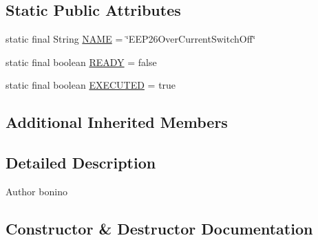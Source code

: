 \subsection*{Static Public Attributes}
\begin{DoxyCompactItemize}
\item 
static final String \hyperlink{classit_1_1polito_1_1elite_1_1enocean_1_1enj_1_1eep_1_1eep26_1_1attributes_1_1_e_e_p26_over_current_switch_off_a407b02293778560ad6dd0c26a29646ae}{N\+A\+ME} = \char`\"{}E\+E\+P26\+Over\+Current\+Switch\+Off\char`\"{}
\item 
static final boolean \hyperlink{classit_1_1polito_1_1elite_1_1enocean_1_1enj_1_1eep_1_1eep26_1_1attributes_1_1_e_e_p26_over_current_switch_off_ad3c43b4a3a126c3e1e597dc3234f8aa4}{R\+E\+A\+DY} = false
\item 
static final boolean \hyperlink{classit_1_1polito_1_1elite_1_1enocean_1_1enj_1_1eep_1_1eep26_1_1attributes_1_1_e_e_p26_over_current_switch_off_a58508b7ef171ca14f1c204d8a5b92233}{E\+X\+E\+C\+U\+T\+ED} = true
\end{DoxyCompactItemize}
\subsection*{Additional Inherited Members}


\subsection{Detailed Description}
\begin{DoxyAuthor}{Author}
bonino 
\end{DoxyAuthor}


\subsection{Constructor \& Destructor Documentation}
\hypertarget{classit_1_1polito_1_1elite_1_1enocean_1_1enj_1_1eep_1_1eep26_1_1attributes_1_1_e_e_p26_over_current_switch_off_ada95f5b37589ed1fcc95b32c712d72ad}{}\label{classit_1_1polito_1_1elite_1_1enocean_1_1enj_1_1eep_1_1eep26_1_1attributes_1_1_e_e_p26_over_current_switch_off_ada95f5b37589ed1fcc95b32c712d72ad} 
